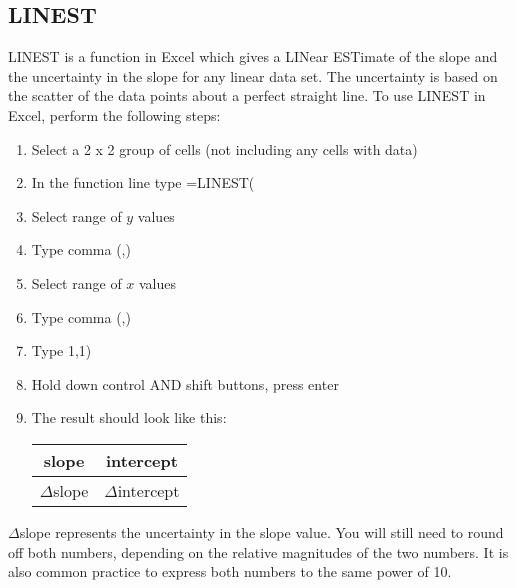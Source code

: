 \newpage

\subsection{LINEST}

LINEST is a function in Excel which gives a LINear ESTimate of the slope and the uncertainty in the slope for any linear data set. The uncertainty is based on the scatter of the data points about a perfect straight line. To use LINEST in Excel, perform the following steps:

\begin{enumerate}

\item Select a 2 x 2 group of cells (not including any cells with data)
\item In the function line type =LINEST(
\item Select range of $y$ values
\item Type comma (,)
\item Select range of $x$ values
\item Type comma (,)
\item Type 1,1)
\item Hold down control AND shift buttons, press enter
\item The result should look like this:

\begin{center} \begin{tabular}{|c|c|} \hline slope & intercept \\ \hline \( \Delta \)slope & \( \Delta \)intercept \\ \hline \end{tabular} \end{center}

\end{enumerate}

\( \Delta \)slope represents the uncertainty in the slope value. You will still need to round off both numbers, depending on the relative magnitudes of the two numbers. It is also common practice to express both numbers to the same power of 10.

